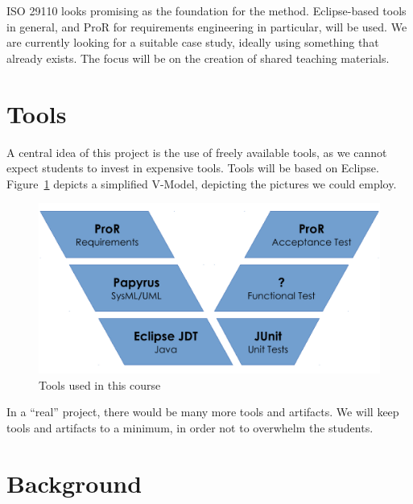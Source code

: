 ISO 29110 looks promising as the foundation for the method. Eclipse-based tools in general, and ProR for requirements engineering in particular, will be used. We are currently looking for a suitable case study, ideally using something that already exists. The focus will be on the creation of shared teaching materials. 

\section{Tools}

A central idea of this project is the use of freely available tools, as we cannot expect students to invest in expensive tools.  Tools will be based on Eclipse.  Figure~\ref{fig:v-model} depicts a simplified V-Model, depicting the pictures we could employ.

\begin{figure}[h!]
  \centering
  \includegraphics[width=\textwidth]{../se-images/v-model.pdf}
  \caption{Tools used in this course}
  \label{fig:v-model}
\end{figure}

\begin{info}
In a ``real'' project, there would be many more tools and artifacts.  We will keep tools and artifacts to a minimum, in order not to overwhelm the students.
\end{info}

\section{Background}


